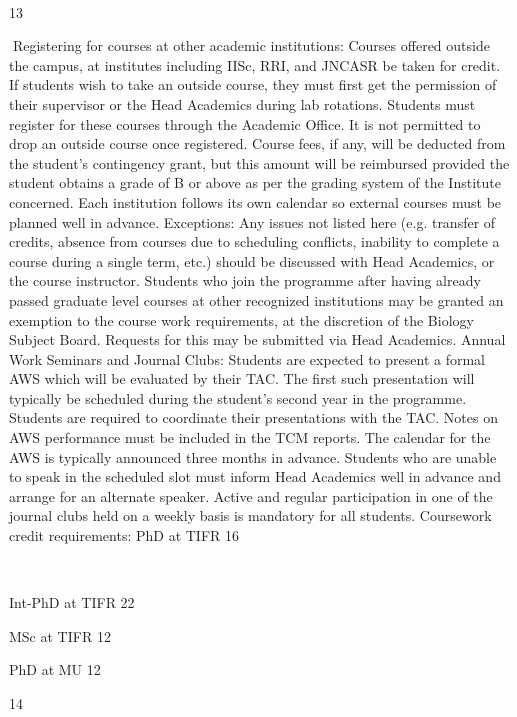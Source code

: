 \documentclass[a4paper,10pt]{article}
\begin{document}
	
  

13	
  

Registering for courses at other academic institutions: Courses offered outside the
campus, at institutes including IISc, RRI, and JNCASR be taken for credit. If students wish
to take an outside course, they must first get the permission of their supervisor or the Head
Academics during lab rotations. Students must register for these courses through the
Academic Office. It is not permitted to drop an outside course once registered. Course fees,
if any, will be deducted from the student’s contingency grant, but this amount will be
reimbursed provided the student obtains a grade of B or above as per the grading system of
the Institute concerned. Each institution follows its own calendar so external courses must
be planned well in advance.
Exceptions: Any issues not listed here (e.g. transfer of credits, absence from courses due to
scheduling conflicts, inability to complete a course during a single term, etc.) should be
discussed with Head Academics, or the course instructor. Students who join the programme
after having already passed graduate level courses at other recognized institutions may be
granted an exemption to the course work requirements, at the discretion of the Biology
Subject Board. Requests for this may be submitted via Head Academics.
Annual Work Seminars and Journal Clubs: Students are expected to present a formal
AWS which will be evaluated by their TAC. The first such presentation will typically be
scheduled during the student's second year in the programme. Students are required to
coordinate their presentations with the TAC. Notes on AWS performance must be included
in the TCM reports. The calendar for the AWS is typically announced three months in
advance. Students who are unable to speak in the scheduled slot must inform Head
Academics well in advance and arrange for an alternate speaker. Active and regular
participation in one of the journal clubs held on a weekly basis is mandatory for all students.
Coursework credit requirements:
PhD at TIFR
16

	
  

Int-PhD at TIFR
22

MSc at TIFR
12

PhD at MU
12

14	
  
\end{document}
